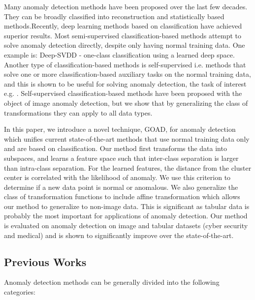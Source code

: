 \documentclass{article} \usepackage{iclr2020_conference,times}
\begin{document}
Many anomaly detection methods have been proposed over the last few decades. They can be broadly classified into reconstruction and statistically based methods.Recently, deep learning methods based on classification have achieved superior results. Most semi-supervised classification-based methods  attempt to solve anomaly detection directly, despite only having normal training data. One example is: Deep-SVDD \citep{ruff2018deep} - one-class classification using a learned deep space. Another type of classification-based methods is self-supervised i.e. methods that solve one or more classification-based auxiliary tasks on the normal training data, and this is shown to be useful for solving anomaly detection, the task of interest e.g. \citep{golan2018deep}. Self-supervised classification-based methods have been proposed with the object of image anomaly detection, but we show that by generalizing the class of transformations they can apply to all data types.

In this paper, we introduce a novel technique, GOAD, for anomaly detection which unifies current state-of-the-art methods that use normal training data only and are based on classification. Our method first transforms the data into  subspaces, and learns a feature space such that inter-class separation is larger than intra-class separation. For the learned features, the distance from the cluster center is correlated with the likelihood of anomaly. We use this criterion to determine if a new data point is normal or anomalous. We also generalize the class of transformation functions to include affine transformation which allows our method to generalize to non-image data. This is significant as tabular data is probably the most important for applications of anomaly detection. Our method is evaluated on anomaly detection on image and tabular datasets (cyber security and medical) and is shown to significantly improve over the state-of-the-art.

\subsection{Previous Works}
\label{sec:prev}

Anomaly detection methods can be generally divided into the following categories:
\end{document}
